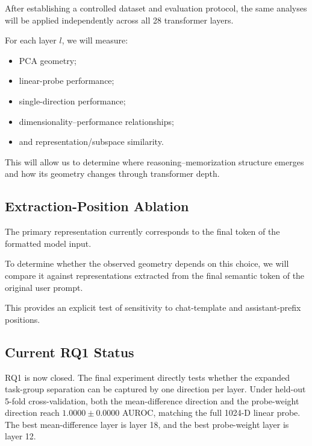 \documentclass[11pt]{article}
\begin{document}
After establishing a controlled dataset and evaluation protocol, the
same analyses will be applied independently across all 28 transformer
layers.

For each layer \(l\), we will measure:

\begin{itemize}

    \item PCA geometry;

    \item linear-probe performance;

    \item single-direction performance;

    \item dimensionality--performance relationships;

    \item and representation/subspace similarity.

\end{itemize}

This will allow us to determine where reasoning--memorization
structure emerges and how its geometry changes through transformer
depth.


\subsection{Extraction-Position Ablation}

The primary representation currently corresponds to the final token
of the formatted model input.

To determine whether the observed geometry depends on this choice, we
will compare it against representations extracted from the final
semantic token of the original user prompt.

This provides an explicit test of sensitivity to chat-template and
assistant-prefix positions.



\subsection{Current RQ1 Status}

RQ1 is now closed. The final experiment directly tests whether the expanded task-group separation can be captured by one direction per layer. Under held-out 5-fold cross-validation, both the mean-difference direction and the probe-weight direction reach \(1.0000 \pm 0.0000\) AUROC, matching the full 1024-D linear probe. The best mean-difference layer is layer 18, and the best probe-weight layer is layer 12.
\end{document}
